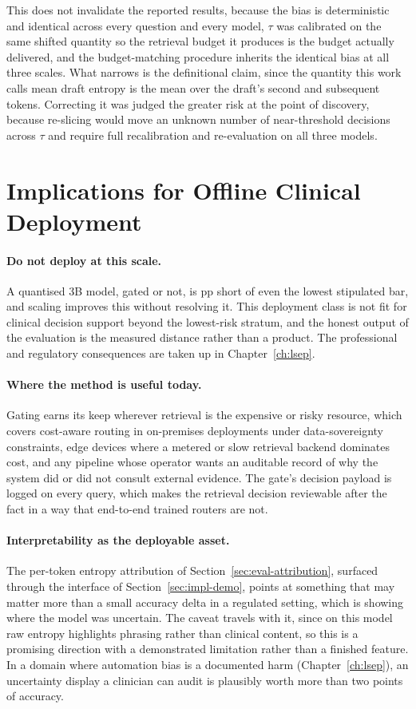 This does not invalidate the reported results, because the bias is
deterministic and identical across every question and every model, $\tau$ was
calibrated on the same shifted quantity so the retrieval budget it produces is
the budget actually delivered, and the budget-matching procedure inherits the
identical bias at all three scales. What narrows is the definitional claim,
since the quantity this work calls mean draft entropy is the mean over the
draft's second and subsequent tokens. Correcting it was judged the greater
risk at the point of discovery, because re-slicing would move an unknown
number of near-threshold decisions across $\tau$ and require full
recalibration and re-evaluation on all three models.

\section{Implications for Offline Clinical Deployment}
\label{sec:disc-deployment}

\paragraph{Do not deploy at this scale.} A quantised 3B model, gated or not,
is \gapToLowBar{}pp short of even the lowest stipulated bar, and scaling
improves this without resolving it. This deployment class is not fit for
clinical decision support beyond the lowest-risk stratum, and the honest
output of the evaluation is the measured distance rather than a product. The
professional and regulatory consequences are taken up in
Chapter~\ref{ch:lsep}.

\paragraph{Where the method is useful today.} Gating earns its keep wherever
retrieval is the expensive or risky resource, which covers cost-aware routing
in on-premises deployments under data-sovereignty constraints, edge devices
where a metered or slow retrieval backend dominates cost, and any pipeline
whose operator wants an auditable record of why the system did or did not
consult external evidence. The gate's decision payload is logged on every
query, which makes the retrieval decision reviewable after the fact in a way
that end-to-end trained routers are not.

\paragraph{Interpretability as the deployable asset.} The per-token entropy
attribution of Section~\ref{sec:eval-attribution}, surfaced through the
interface of Section~\ref{sec:impl-demo}, points at something that may matter
more than a small accuracy delta in a regulated setting, which is showing
where the model was uncertain. The caveat travels with it, since on this model
raw entropy highlights phrasing rather than clinical content, so this is a
promising direction with a demonstrated limitation rather than a finished
feature. In a domain where automation bias is a documented harm
(Chapter~\ref{ch:lsep}), an uncertainty display a clinician can audit is
plausibly worth more than two points of accuracy.